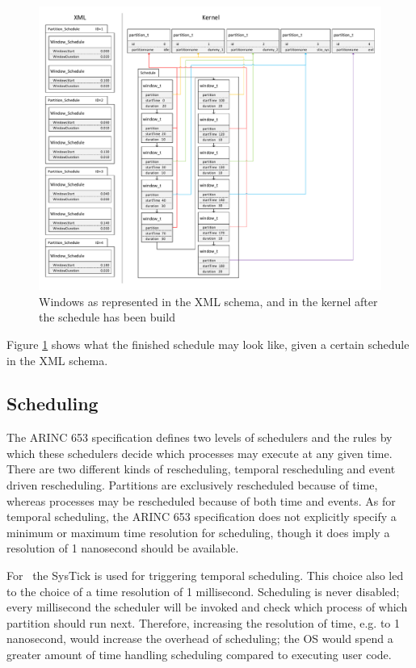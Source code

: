 \begin{figure}
	\centerline{\includegraphics[width=\paperwidth,angle=90,clip,trim=0 1cm 0 0]{figures/demo_windows.pdf}}
	\caption{Windows as represented in the XML schema, and in the kernel after 
	the schedule has been build}
	\label{fig:demo_windows}
\end{figure}
Figure \ref{fig:demo_windows} shows what the finished schedule may look like,
given a certain schedule in the XML schema.


\subsection{Scheduling}
The ARINC 653 specification defines two levels of schedulers and the rules by
which these schedulers decide which processes may execute at any given time.
There are two different kinds of rescheduling, temporal rescheduling and event
driven rescheduling. Partitions are exclusively rescheduled because of time,
whereas processes may be rescheduled because of both time and events.
As for temporal scheduling, the ARINC 653 specification does not explicitly
specify a minimum or maximum time resolution for scheduling, though it does
imply a resolution of 1 nanosecond should be available\cite{arinc_time}.

For \OSname\ the SysTick is used for triggering temporal scheduling. This choice
also led to the choice of a time resolution of 1 millisecond. Scheduling is
never disabled; every millisecond the scheduler will be invoked and check which
process of which partition should run next. Therefore, increasing the resolution
of time, e.g. to 1 nanosecond, would increase the overhead of scheduling; the OS
would spend a greater amount of time handling scheduling compared to executing
user code.

